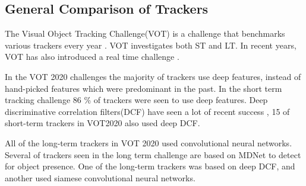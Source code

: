 \subsection{General Comparison of Trackers}
  The Visual Object Tracking Challenge(VOT) is a challenge that benchmarks various trackers every year \cite{VOT2017} \cite{VOT2020}.
  VOT investigates both ST and LT.
  In recent years, VOT has also introduced a real time challenge \cite{VOT2020}.

  In the VOT 2020 challenges the majority of trackers use deep features, instead of hand-picked features which were predominant in the past.
  In the short term tracking challenge 86 \% of trackers were seen to use deep features.
  Deep discriminative correlation filters(DCF) have seen a lot of recent success \cite{danelljan2019}, 15 of short-term trackers in VOT2020 also used deep DCF.

  All of the long-term trackers in VOT 2020 used convolutional neural networks.
  Several of trackers seen in the long term challenge are based on MDNet \cite{CNNTracking} to detect for object presence.
  One of the long-term trackers was based on deep DCF, and another used siamese convolutional neural networks.
